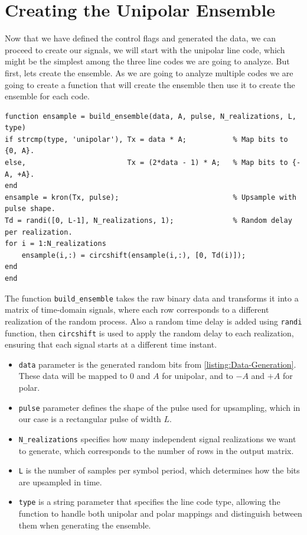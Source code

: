 \chapter[Creating the Unipolar Ensemble]{Creating the Unipolar Ensemble}
\label{cp:creating-the-unipolar-ensemble}

Now that we have defined the control flags and generated the data, we can
proceed to create our signals, we will start with the unipolar line code, which
might be the simplest among the three line codes we are going to analyze. But
first, lets create the ensemble. As we are going to analyze multiple codes we
are going to create a function that will create the ensemble then use it to
create the ensemble for each code.

\begin{listing}[!htpb]
    \caption{Creating Ensemble function.}
    \label{listing:Data-Generation}
    \begin{verbatim}
function ensample = build_ensemble(data, A, pulse, N_realizations, L, type)
if strcmp(type, 'unipolar'), Tx = data * A;           % Map bits to {0, A}.
else,                        Tx = (2*data - 1) * A;   % Map bits to {-A, +A}.
end
ensample = kron(Tx, pulse);                           % Upsample with pulse shape.
Td = randi([0, L-1], N_realizations, 1);              % Random delay per realization.
for i = 1:N_realizations
    ensample(i,:) = circshift(ensample(i,:), [0, Td(i)]);
end
end
    \end{verbatim}
\end{listing}

The function \texttt{build\_ensemble} takes the raw binary data and transforms
it into a matrix of time-domain signals, where each row corresponds to a
different realization of the random process. Also a random time delay is added
using \texttt{randi} function, then \texttt{circshift} is used to apply the
random delay to each realization, ensuring that each signal starts at a
different time instant.
\begin{itemize}

    \item \texttt{data} parameter is the generated random bits from
          \autoref{listing:Data-Generation}. These data will be mapped to $0$ and $A$ for
          unipolar, and to $-A$ and $+A$ for polar.
    \item \texttt{pulse} parameter defines the shape of the pulse used for
          upsampling, which in our case is a rectangular pulse of width $L$.
    \item \texttt{N\_realizations} specifies how many independent signal realizations we want to generate, which corresponds to the number of rows in the output matrix.
    \item \texttt{L} is the number of samples per symbol period, which determines how the bits are upsampled in time.
    \item \texttt{type} is a string parameter that specifies the line code type, allowing the function to
          handle both unipolar and polar mappings and distinguish between them when generating the ensemble.

\end{itemize}

